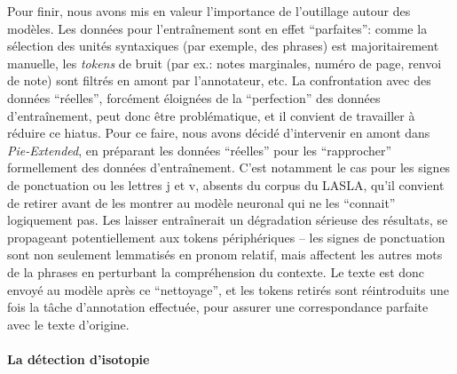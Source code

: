 Pour finir, nous avons mis en valeur l'importance de l'outillage autour des modèles. Les données pour l'entraînement sont en effet \enquote{parfaites}: comme la sélection des unités syntaxiques (par exemple, des phrases) est majoritairement manuelle, les \textit{tokens} de bruit (par ex.: notes marginales, numéro de page, renvoi de note) sont filtrés en amont par l'annotateur, etc. La confrontation avec des données \enquote{réelles}, forcément éloignées de la \enquote{perfection} des données d'entraînement, peut donc être problématique, et il convient de travailler à réduire ce hiatus. Pour ce faire, nous avons décidé d'intervenir en amont dans \textit{Pie-Extended}, en préparant les données \enquote{réelles} pour les \enquote{rapprocher} formellement des données d'entraînement. C'est notamment le cas pour les signes de ponctuation ou les lettres j et v, absents du corpus du LASLA, qu'il convient de retirer avant de les montrer au modèle neuronal qui ne les \enquote{connait} logiquement pas. Les laisser entraînerait un dégradation sérieuse des résultats, se propageant potentiellement aux tokens périphériques -- les signes de ponctuation sont non seulement lemmatisés en pronom relatif, mais affectent les autres mots de la phrases en perturbant la compréhension du contexte. Le texte est donc envoyé au modèle après ce \enquote{nettoyage}, et les tokens retirés sont réintroduits une fois la tâche d'annotation effectuée, pour assurer une correspondance parfaite avec le texte d'origine.

\paragraph{La détection d'isotopie}

